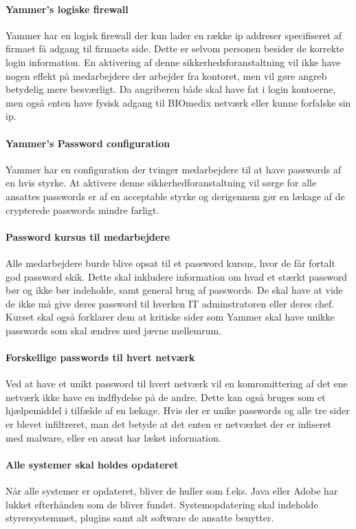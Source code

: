\documentclass{article}
\begin{document}
\paragraph{Yammer's logiske firewall}
Yammer har en logisk firewall der kun lader en række ip addreser specifiseret af firmaet
få adgang til firmaets side. Dette er selvom personen besider de korrekte login information.
En aktivering af denne sikkerhedsforanstaltning vil ikke have nogen effekt på medarbejdere
der arbejder fra kontoret, men vil gøre angreb betydelig mere besværligt. Da angriberen
både skal have fat i login kontoerne, men også enten have fysisk adgang til BIOmedix netværk
eller kunne forfalske sin ip.

\paragraph{Yammer's Password configuration}
Yammer har en configuration der tvinger medarbejdere til at have passwords af en hvis styrke.
At aktivere denne sikkerhedforanstaltning vil sørge for alle ansattes passwords er af en
acceptable styrke og derigennem gør en lækage af de crypterede passwords mindre farligt.

\paragraph{Password kursus til medarbejdere}
Alle medarbejdere burde blive opsat til et password kursus, hvor de får fortalt god password 
skik. Dette skal inkludere information om hvad et stærkt password bør og ikke bør indeholde,
samt general brug af passwords. De skal have at vide de ikke må give deres password til 
hverken IT adminstratoren eller deres chef. Kurset skal også forklarer dem at kritiske sider
som Yammer skal have unikke passwords som skal ændres med jævne mellemrum. 

\paragraph{Forskellige passwords til hvert netværk}
Ved at have et unikt password til hvert netværk vil en komromittering af det ene netværk ikke
have en indflydelse på de andre. Dette kan også bruges som et hjælpemiddel i tilfælde af en
lækage. Hvis der er unike passwords og alle tre sider er blevet infiltreret, man det betyde
at det enten er netværket der er infiseret med malware, eller en ansat har læket information.

\paragraph{Alle systemer skal holdes opdateret}
Når alle systemer er opdateret, bliver de huller som f.eks. Java eller Adobe har lukket efterhånden
som de bliver fundet. Systemopdatering skal indeholde styrersystemmet, plugins samt alt software
de ansatte benytter.
\end{document}
